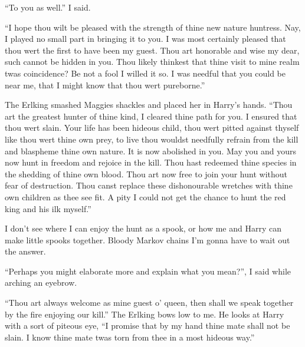 ``To you as well.'' I said.
	
	``I hope thou wilt be pleased with the strength of thine new nature huntress. Nay, I played no small part in bringing it to you. I was most certainly pleased that thou wert the first to have been my guest. Thou art honorable and wise my dear, such cannot be hidden in you. Thou likely thinkest that thine visit to mine realm twas coincidence? Be not a fool I willed it so. I was needful that you could be near me, that I might know that thou wert pureborne.''

	The Erlking smashed Maggies shackles and placed her in Harry's hands. ``Thou art the greatest hunter of thine kind, I cleared thine path for you. I ensured that thou wert slain. Your life has been hideous child, thou wert pitted against thyself like thou wert thine own prey, to live thou wouldst needfully refrain from the kill and blaspheme thine own nature. It is now abolished in you. May you and yours now hunt in freedom and rejoice in the kill. Thou hast redeemed thine species in the shedding of thine own blood. Thou art now free to join your hunt without fear of destruction. Thou canst replace these dishonourable wretches with thine own children as thee see fit. A pity I could not get the chance to hunt the red king and his ilk myself.''
	
	I don't see where I can enjoy the hunt as a spook, or how me and Harry can make little spooks together. Bloody Markov chains I'm gonna have to wait out the answer.

``Perhaps you might elaborate more and explain what you mean?'', I said while arching an eyebrow.
	
	``Thou art always welcome as mine guest o' queen, then shall we speak together by the fire enjoying our kill.'' The Erlking bows low to me. He looks at Harry with a sort of piteous eye, ``I promise that by my hand thine mate shall not be slain. I know thine mate twas torn from thee in a most hideous way.''\\

